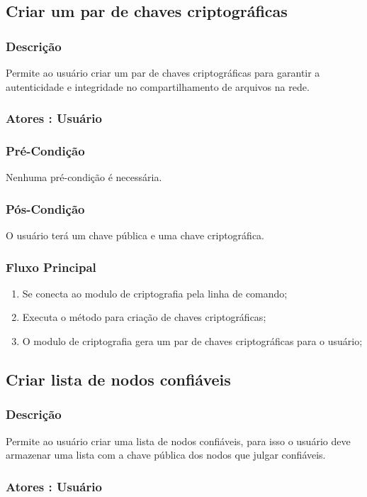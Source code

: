 \subsection{Criar um par de chaves criptográficas}
\subsubsection{Descrição}
Permite ao usuário criar um par de chaves criptográficas para garantir a autenticidade e integridade no compartilhamento de arquivos na rede.
\subsubsection{Atores : Usuário}
\subsubsection{Pré-Condição}
Nenhuma pré-condição é necessária.
\subsubsection{Pós-Condição}
O usuário terá um chave pública e uma chave criptográfica.
\subsubsection{Fluxo Principal}
\begin{enumerate}
    \item Se conecta ao modulo de criptografia pela linha de comando;
    \item Executa o método para criação de chaves criptográficas;
    \item O modulo de criptografia gera um par de chaves criptográficas para o usuário;
\end{enumerate}


\subsection{Criar lista de nodos confiáveis}
\subsubsection{Descrição}
Permite ao usuário criar uma lista de nodos confiáveis, para isso o usuário deve armazenar uma lista com a chave pública dos nodos que julgar confiáveis.
\subsubsection{Atores : Usuário}

